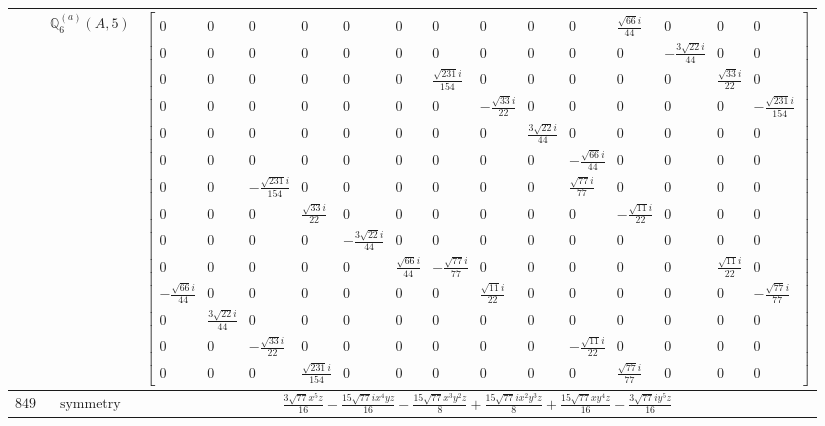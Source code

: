 \documentclass[fleqn,8pt,landscape]{jsarticle}
\begin{document}
\begin{longtable}{ccc}
$  $ & $ \mathbb{Q}_{6}^{(a)}(A,5) $ & $ \begin{bmatrix} 0 & 0 & 0 & 0 & 0 & 0 & 0 & 0 & 0 & 0 & \frac{\sqrt{66} i}{44} & 0 & 0 & 0 \\ 0 & 0 & 0 & 0 & 0 & 0 & 0 & 0 & 0 & 0 & 0 & - \frac{3 \sqrt{22} i}{44} & 0 & 0 \\ 0 & 0 & 0 & 0 & 0 & 0 & \frac{\sqrt{231} i}{154} & 0 & 0 & 0 & 0 & 0 & \frac{\sqrt{33} i}{22} & 0 \\ 0 & 0 & 0 & 0 & 0 & 0 & 0 & - \frac{\sqrt{33} i}{22} & 0 & 0 & 0 & 0 & 0 & - \frac{\sqrt{231} i}{154} \\ 0 & 0 & 0 & 0 & 0 & 0 & 0 & 0 & \frac{3 \sqrt{22} i}{44} & 0 & 0 & 0 & 0 & 0 \\ 0 & 0 & 0 & 0 & 0 & 0 & 0 & 0 & 0 & - \frac{\sqrt{66} i}{44} & 0 & 0 & 0 & 0 \\ 0 & 0 & - \frac{\sqrt{231} i}{154} & 0 & 0 & 0 & 0 & 0 & 0 & \frac{\sqrt{77} i}{77} & 0 & 0 & 0 & 0 \\ 0 & 0 & 0 & \frac{\sqrt{33} i}{22} & 0 & 0 & 0 & 0 & 0 & 0 & - \frac{\sqrt{11} i}{22} & 0 & 0 & 0 \\ 0 & 0 & 0 & 0 & - \frac{3 \sqrt{22} i}{44} & 0 & 0 & 0 & 0 & 0 & 0 & 0 & 0 & 0 \\ 0 & 0 & 0 & 0 & 0 & \frac{\sqrt{66} i}{44} & - \frac{\sqrt{77} i}{77} & 0 & 0 & 0 & 0 & 0 & \frac{\sqrt{11} i}{22} & 0 \\ - \frac{\sqrt{66} i}{44} & 0 & 0 & 0 & 0 & 0 & 0 & \frac{\sqrt{11} i}{22} & 0 & 0 & 0 & 0 & 0 & - \frac{\sqrt{77} i}{77} \\ 0 & \frac{3 \sqrt{22} i}{44} & 0 & 0 & 0 & 0 & 0 & 0 & 0 & 0 & 0 & 0 & 0 & 0 \\ 0 & 0 & - \frac{\sqrt{33} i}{22} & 0 & 0 & 0 & 0 & 0 & 0 & - \frac{\sqrt{11} i}{22} & 0 & 0 & 0 & 0 \\ 0 & 0 & 0 & \frac{\sqrt{231} i}{154} & 0 & 0 & 0 & 0 & 0 & 0 & \frac{\sqrt{77} i}{77} & 0 & 0 & 0 \end{bmatrix} $ \\ \hline
$ 849 $ & $ \text{symmetry} $ & $ \frac{3 \sqrt{77} x^{5} z}{16} - \frac{15 \sqrt{77} i x^{4} y z}{16} - \frac{15 \sqrt{77} x^{3} y^{2} z}{8} + \frac{15 \sqrt{77} i x^{2} y^{3} z}{8} + \frac{15 \sqrt{77} x y^{4} z}{16} - \frac{3 \sqrt{77} i y^{5} z}{16} $ \\

\end{longtable}
\end{document}
